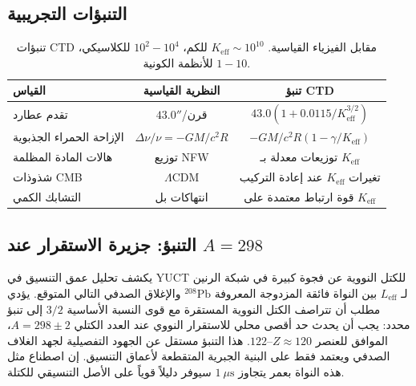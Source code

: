 \documentclass[11pt,a4paper]{article}
\begin{document}
	\subsection{التنبؤات التجريبية}
	\begin{table}[htbp]
		\centering
		\begin{english}
			\begin{tabular}{lcc}
				\toprule
				\textbf{القياس} & \textbf{النظرية القياسية} & \textbf{تنبؤ CTD} \\
				\midrule
				تقدم عطارد & $43.0''$/قرن & $43.0(1 + 0.0115/K_{\mathrm{eff}}^{3/2})$ \\
				الإزاحة الحمراء الجذبوية & $\Delta\nu/\nu = -GM/c^2R$ & $-GM/c^2R(1 - \gamma/K_{\mathrm{eff}})$ \\
				هالات المادة المظلمة & توزيع NFW & توزيعات معدلة بـ $K_{\mathrm{eff}}$ \\
				شذوذات CMB & $\Lambda$CDM & تغيرات $K_{\mathrm{eff}}$ عند إعادة التركيب \\
				التشابك الكمي & انتهاكات بل & قوة ارتباط معتمدة على $K_{\mathrm{eff}}$ \\
				\bottomrule
			\end{tabular}
		\end{english}
		\caption{تنبؤات CTD مقابل الفيزياء القياسية. $K_{\mathrm{eff}} \sim 10^{10}$ للكم، $10^2-10^4$ للكلاسيكي، $1-10$ للأنظمة الكونية.}
	\end{table}
	
	\subsection{التنبؤ: جزيرة الاستقرار عند $A=298$}
	يكشف تحليل عمق التنسيق في YUCT للكتل النووية عن فجوة كبيرة في شبكة الرنين لـ $L_{\mathrm{eff}}$ بين النواة فائقة المزدوجة المعروفة $^{208}\mathrm{Pb}$ والإغلاق الصدفي التالي المتوقع. يؤدي مطلب أن تتراصف الكتل النووية المستقرة مع قوى النسبة الأساسية $3/2$ إلى تنبؤ محدد: يجب أن يحدث حد أقصى محلي للاستقرار النووي عند العدد الكتلي $A = 298 \pm 2$، الموافق للعنصر $Z \approx 120$--$122$. هذا التنبؤ مستقل عن الجهود التفصيلية لجهد الغلاف الصدفي ويعتمد فقط على البنية الجبرية المتقطعة لأعماق التنسيق. إن اصطناع مثل هذه النواة بعمر يتجاوز $1\ \mu\text{s}$ سيوفر دليلاً قوياً على الأصل التنسيقي للكتلة.
	
\end{document}
